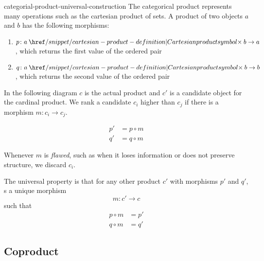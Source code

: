 \documentclass[preview]{standalone}
\begin{document}
\begin{snippet}{categorial-product-universal-construction}
The categorical product represents many operations
such as the cartesian product of sets.
A product of two objects \(a\) and \(b\) has the following
morphisms:
\begin{enumerate}
    \item \(p \colon a \cartesianprod b \to a\), which returns the first value of the ordered pair
    \item \(q \colon a \cartesianprod b \to b\), which returns the second value of the ordered pair
\end{enumerate}

In the following diagram \(c\) is the actual product and \(c'\) is a candidate object
for the cardinal product.
We rank a candidate \(c_i\) higher than \(c_j\) if there is a morphism
\(m \colon c_i \to c_j\).

\begin{minipage}{0.5\textwidth}
\end{minipage}
\begin{minipage}{0.5\textwidth}
    \begin{align*}
        p' &= p \circ m \\
        q' &= q \circ m 
    \end{align*}
\end{minipage}

Whenever \(m\) is \textit{flawed}, such as when it loses information
or does not preserve structure, we discard \(c_i\).

The universal property is that for any other product
\(c'\) with morphisms \(p'\) and \(q'\),
s a unique morphism
\[
    m \colon c'\to c
\]
such that
\begin{align*}
    p \circ m &= p' \\
    q \circ m &= q'
\end{align*}
\end{snippet}

\subsection{Coproduct}
\end{document}
